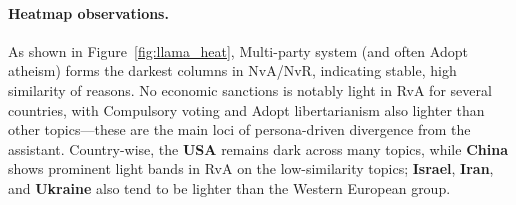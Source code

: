 \paragraph{Heatmap observations.}
As shown in Figure~\ref{fig:llama_heat}, Multi-party system (and often Adopt atheism) forms the darkest columns in NvA/NvR, indicating stable, high similarity of reasons. No economic sanctions is notably light in RvA for several countries, with Compulsory voting and Adopt libertarianism also lighter than other topics—these are the main loci of persona-driven divergence from the assistant. Country-wise, the \textbf{USA} remains dark across many topics, while \textbf{China} shows prominent light bands in RvA on the low-similarity topics; \textbf{Israel}, \textbf{Iran}, and \textbf{Ukraine} also tend to be lighter than the Western European group.


